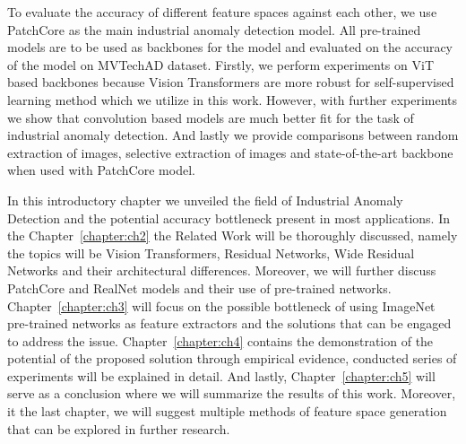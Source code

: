 To evaluate the accuracy of different feature spaces against each other, we use PatchCore\cite{patchcore} as the main industrial anomaly detection model\cite{iad_survey}. All pre-trained models are to be used as backbones\cite{pre_trained} for the model and evaluated\cite{auroc} on the accuracy of the model on MVTechAD\cite{mvtecad} dataset. Firstly, we perform experiments on ViT\cite{vit} based backbones because Vision Transformers\cite{vit} are more robust for self-supervised learning method\cite{self_supervised_survey} which we utilize in this work. However, with further experiments we show that convolution based models\cite{lenet} are much better fit for the task of industrial anomaly detection\cite{iad_survey}. And lastly we provide comparisons between random extraction of images, selective extraction of images and state-of-the-art backbone when used with PatchCore model.

In this introductory chapter we unveiled the field of Industrial Anomaly Detection\cite{iad_survey} and the potential accuracy bottleneck present in most applications. In the Chapter~\ref{chapter:ch2} the Related Work will be thoroughly discussed, namely the topics will be Vision Transformers\cite{vit}, Residual Networks\cite{resnet}, Wide Residual Networks\cite{wideresnet} and their architectural differences. Moreover, we will further discuss PatchCore\cite{patchcore} and RealNet\cite{realnet} models and their use of pre-trained networks\cite{pre_trained}. Chapter~\ref{chapter:ch3} will focus on the possible bottleneck of using ImageNet\cite{imagenet} pre-trained networks as feature extractors and the solutions that can be engaged to address the issue. Chapter~\ref{chapter:ch4} contains the demonstration of the potential of the proposed solution through empirical evidence, conducted series of experiments will be explained in detail. And lastly, Chapter~\ref{chapter:ch5} will serve as a conclusion where we will summarize the results of this work. Moreover, it the last chapter, we will suggest multiple methods of feature space generation that can be explored in further research.